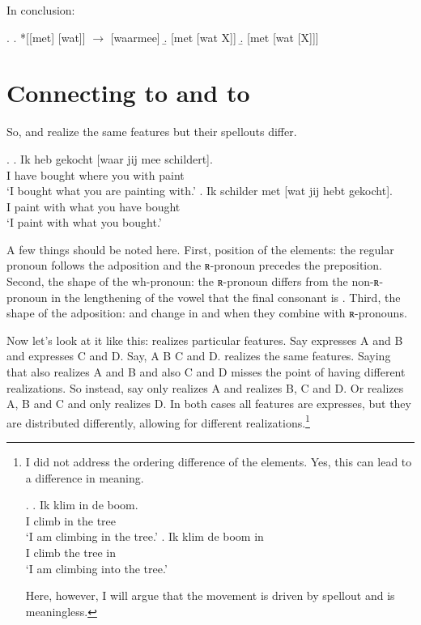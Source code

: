 \documentclass{article}
\begin{document}
In conclusion:

\ex.
\a. *[[met] [wat]] $\rightarrow$ [waarmee]
\b. [met [wat X]]
\b. [met [wat [X]]]




\section{Connecting  to  and  to }

So,  and  realize the same features but their spellouts differ.

\ex.
\ag. Ik heb gekocht [waar jij mee schildert].\\
 I have bought where you with paint\\
 `I bought what you are painting with.'
\bg. Ik schilder met [wat jij hebt gekocht].\\
 I paint with what you have bought\\
 `I paint with what you bought.'

A few things should be noted here. First, position of the elements: the regular pronoun follows the adposition and the ʀ-pronoun precedes the preposition. Second, the shape of the wh-pronoun: the ʀ-pronoun differs from the non-ʀ-pronoun in the lengthening of the vowel that the final consonant is . Third, the shape of the adposition:  and  change in  and  when they combine with ʀ-pronouns.

Now let's look at it like this:  realizes particular features. Say  expresses A and B and  expresses C and D. Say, A B C and D.  realizes the same features. Saying that  also realizes A and B and  also C and D misses the point of having different realizations. So instead, say  only realizes A and  realizes B, C and D. Or  realizes A, B and C and  only realizes D. In both cases all features are expresses, but they are distributed differently, allowing for different realizations.\footnote{I did not address the ordering difference of the elements. Yes, this can lead to a difference in meaning.

\ex.
\ag. Ik klim in de boom.\\
 I climb in the tree\\
 `I am climbing in the tree.'
\bg. Ik klim de boom in\\
 I climb the tree in\\
 `I am climbing into the tree.'

Here, however, I will argue that the movement is driven by spellout and is meaningless.}
\end{document}
